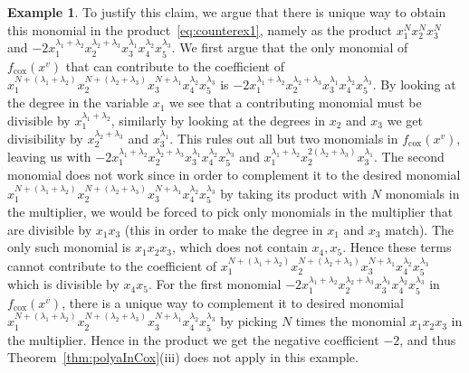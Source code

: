 \documentclass[a4paper,11pt]{amsart}
\theoremstyle{definition}
\newtheorem{example}[theorem]{Example}
\newcommand{\cox}{\mathrm{cox}}
\begin{document}
\begin{example}
To justify this claim, we argue that there is unique way to obtain this monomial in the product~\eqref{eq:counterex1}, namely as the product $x_1^{N}x_2^{N}x_3^{N}$ and $-2x_1^{\lambda_1 + \lambda_2}x_2^{\lambda_2 + \lambda_3}x_3^{\lambda_1}x_4^{\lambda_2}x_5^{\lambda_3}$. We first argue that the only monomial of $f_\cox(x^v)$ that can contribute to the coefficient of $x_1^{N+(\lambda_1+\lambda_2)}x_2^{N+(\lambda_2 + \lambda_3)}x_3^{N+\lambda_1}x_4^{\lambda_2}x_5^{\lambda_3}$ is $-2x_1^{\lambda_1 + \lambda_2}x_2^{\lambda_2 + \lambda_3}x_3^{\lambda_1}x_4^{\lambda_2}x_5^{\lambda_3}$. By looking at the degree in the variable $x_1$ we see that a contributing monomial must be divisible by $x_1^{\lambda_1+\lambda_2}$, similarly by looking at the degrees in $x_2$ and $x_3$ we get divisibility by $x_2^{\lambda_2+\lambda_3}$ and $x_3^{\lambda_1}$. This rules out all but two monomials in $f_\cox(x^v)$, leaving us with $-2x_1^{\lambda_1 + \lambda_2}x_2^{\lambda_2 + \lambda_3}x_3^{\lambda_1}x_4^{\lambda_2}x_5^{\lambda_3}$ and $x_1^{\lambda_1+\lambda_2}x_2^{2(\lambda_2+\lambda_3)}x_3^{\lambda_1}$. The second monomial does not work since in order to complement it to the desired monomial $x_1^{N+(\lambda_1+\lambda_2)}x_2^{N+(\lambda_2 + \lambda_3)}x_3^{N+\lambda_1}x_4^{\lambda_2}x_5^{\lambda_3}$ by taking its product with $N$ monomials in the multiplier, we would be forced to pick only monomials in the multiplier that are divisible by $x_1x_3$ (this in order to make the degree in $x_1$ and $x_3$ match). The only such monomial is $x_1x_2x_3$, which does not contain $x_4,x_5$. Hence these terms cannot contribute to the coefficient of $x_1^{N+(\lambda_1+\lambda_2)}x_2^{N+(\lambda_2 + \lambda_3)}x_3^{N+\lambda_1}x_4^{\lambda_2}x_5^{\lambda_3}$ which is divisible by $x_4x_5$. For the first monomial  $-2x_1^{\lambda_1 + \lambda_2}x_2^{\lambda_2 + \lambda_3}x_3^{\lambda_1}x_4^{\lambda_2}x_5^{\lambda_3}$ in $f_\cox(x^v)$, there is a unique way to complement it to desired monomial $x_1^{N+(\lambda_1+\lambda_2)}x_2^{N+(\lambda_2 + \lambda_3)}x_3^{N+\lambda_1}x_4^{\lambda_2}x_5^{\lambda_3}$ by picking $N$ times the monomial $x_1x_2x_3$ in the multiplier. Hence in the product we get the negative coefficient $-2$, and thus Theorem~\ref{thm:polyaInCox}(iii) does not apply in this example.
    

\end{example}
\end{document}
